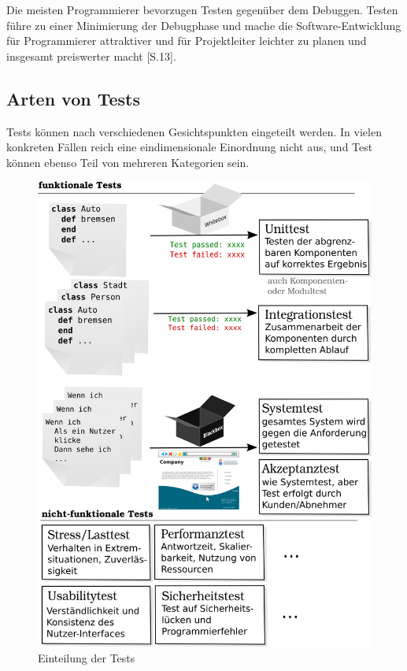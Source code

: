 Die meisten Programmierer bevorzugen Testen gegenüber dem Debuggen. Testen führe zu einer Minimierung der Debugphase und mache die Software-Entwicklung für Programmierer attraktiver und für Projektleiter leichter zu planen \citep{orsini_rails_2007} und insgesamt preiswerter macht \citep{liggesmeyer_modultest_1990}[S.13].


\subsection{Arten von Tests}
Tests können nach verschiedenen Gesichtspunkten eingeteilt werden. In vielen konkreten Fällen reich eine eindimensionale Einordnung nicht aus, und Test können ebenso Teil von mehreren Kategorien sein.
\begin{figure}[hp]
 \centering
 \includegraphics[width=\textwidth]{./diagrams/testarten.png}
 \caption{Einteilung der Tests}
 \label{fig:testArten}
\end{figure}

